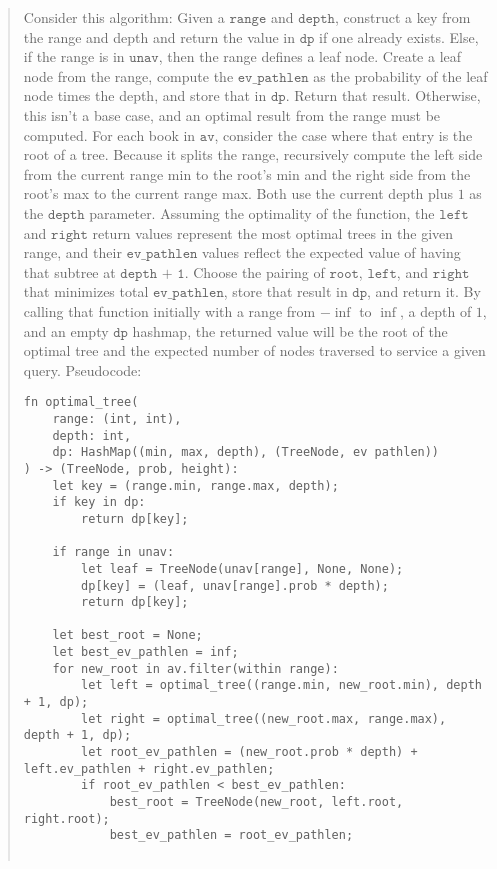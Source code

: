 \documentclass[11pt]{article}
\newcommand{\code}[1]{$\texttt{#1}$}
\begin{document}
\begin{enumerate}
\begin{quote}
\medskip
Consider this algorithm: Given a \code{range} and \code{depth}, construct a key from the range and depth and return the value in \code{dp} if one already exists. Else, if the range is in \code{unav}, then the range defines a leaf node. Create a leaf node from the range, compute the \code{ev\_pathlen} as the probability of the leaf node times the depth, and store that in \code{dp}. Return that result. Otherwise, this isn't a base case, and an optimal result from the range must be computed. For each book in \code{av}, consider the case where that entry is the root of a tree. Because it splits the range, recursively compute the left side from the current range min to the root's min and the right side from the root's max to the current range max. Both use the current depth plus $1$ as the \code{depth} parameter. Assuming the optimality of the function, the \code{left} and \code{right} return values represent the most optimal trees in the given range, and their \code{ev\_pathlen} values reflect the expected value of having that subtree at \code{depth + 1}. Choose the pairing of \code{root}, \code{left}, and \code{right} that minimizes total \code{ev\_pathlen}, store that result in \code{dp}, and return it. By calling that function initially with a range from $-\inf$ to $\inf$, a depth of $1$, and an empty \code{dp} hashmap, the returned value will be the root of the optimal tree and the expected number of nodes traversed to service a given query. Pseudocode: 

\newpage
\begin{Verbatim}[xleftmargin=-6em]
fn optimal_tree(
    range: (int, int), 
    depth: int, 
    dp: HashMap((min, max, depth), (TreeNode, ev pathlen))
) -> (TreeNode, prob, height):
    let key = (range.min, range.max, depth);
    if key in dp:
        return dp[key];

    if range in unav:
        let leaf = TreeNode(unav[range], None, None);
        dp[key] = (leaf, unav[range].prob * depth);
        return dp[key];
    
    let best_root = None;
    let best_ev_pathlen = inf;
    for new_root in av.filter(within range):
        let left = optimal_tree((range.min, new_root.min), depth + 1, dp);
        let right = optimal_tree((new_root.max, range.max), depth + 1, dp);        
        let root_ev_pathlen = (new_root.prob * depth) + left.ev_pathlen + right.ev_pathlen;
        if root_ev_pathlen < best_ev_pathlen:
            best_root = TreeNode(new_root, left.root, right.root);
            best_ev_pathlen = root_ev_pathlen;


\end{Verbatim}
\end{quote}
\end{enumerate}
\end{document}
